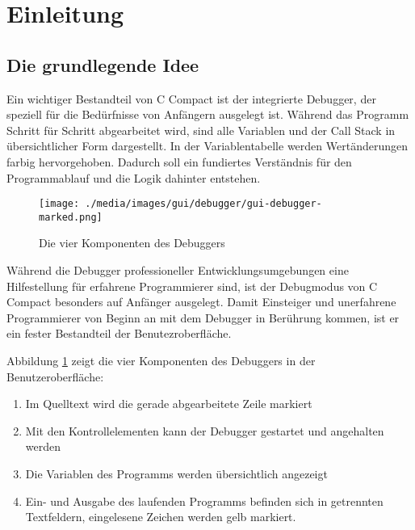 

\section{Einleitung}


\subsection{Die grundlegende Idee}
\label{sec:deb-idea}
Ein wichtiger Bestandteil von C Compact ist der integrierte Debugger, der speziell für die Bedürfnisse von Anfängern ausgelegt ist. Während das Programm Schritt für Schritt abgearbeitet wird, sind alle Variablen und der Call Stack in übersichtlicher Form dargestellt. In der Variablentabelle werden Wertänderungen farbig hervorgehoben. Dadurch soll ein fundiertes Verständnis für den Programmablauf und die Logik dahinter entstehen.

\begin{figure}[h]
\centering
\texttt{[image: ./media/images/gui/debugger/gui-debugger-marked.png]}
\caption{Die vier Komponenten des Debuggers}
\label{fig:deb-intro-m1}
\end{figure}

Während die Debugger professioneller Entwicklungsumgebungen eine Hilfestellung für erfahrene Programmierer sind, ist der Debugmodus von C Compact besonders auf Anfänger ausgelegt. Damit Einsteiger und unerfahrene Programmierer von Beginn an mit dem Debugger in Berührung kommen, ist er ein fester Bestandteil der Benutezroberfläche.

Abbildung \ref{fig:deb-intro-m1} zeigt die vier Komponenten des Debuggers in der Benutzeroberfläche:
\begin{enumerate}
\item Im Quelltext wird die gerade abgearbeitete Zeile markiert
\item Mit den Kontrollelementen kann der Debugger gestartet und angehalten werden
\item Die Variablen des Programms werden übersichtlich angezeigt
\item Ein- und Ausgabe des laufenden Programms befinden sich in getrennten Textfeldern, eingelesene Zeichen werden gelb markiert.
\end{enumerate}

